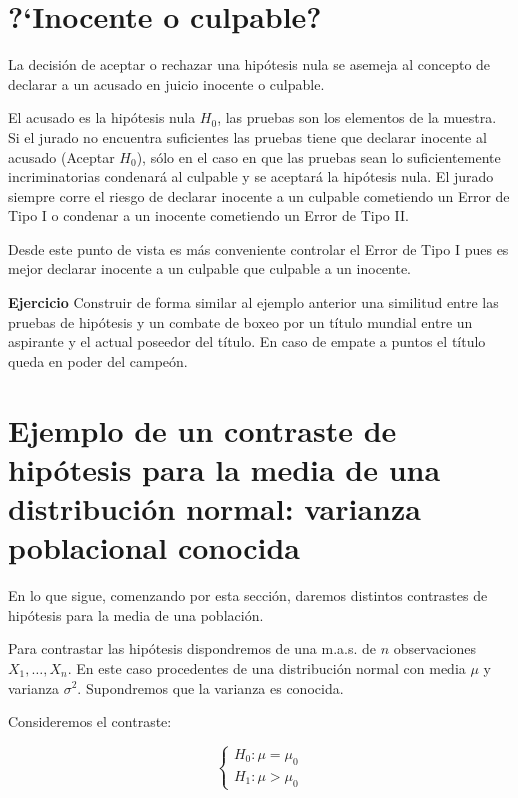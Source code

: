 \documentclass[12pt]{report}
\begin{document}
   \section{?`Inocente o culpable?}

   La decisión de aceptar o rechazar una hipótesis nula se asemeja
   al concepto de declarar a un acusado en juicio inocente o culpable.

   El acusado es la hipótesis nula $H_{0}$, las pruebas son los
   elementos de la muestra. Si el jurado no encuentra suficientes las
   pruebas tiene que declarar inocente al acusado (Aceptar $H_{0}$),
   sólo en el caso en que las pruebas sean lo suficientemente
   incriminatorias condenará al culpable y se aceptará la hipótesis
   nula. El jurado siempre corre el riesgo de declarar inocente a un
   culpable cometiendo un Error de Tipo I o
    condenar a un inocente cometiendo un Error de Tipo II.

   Desde este punto de vista es más conveniente controlar el Error de
   Tipo I pues es mejor declarar inocente a un culpable que culpable
   a un inocente.

   \textbf{Ejercicio}
   Construir de forma similar al ejemplo anterior una similitud entre
   las pruebas de hipótesis y un combate de boxeo por un título
   mundial entre un aspirante y el actual poseedor del título.
    En caso de empate a puntos  el título queda en
   poder del campeón.

    \section{Ejemplo de un  contraste de hipótesis para la media  de una
    distribución normal: varianza poblacional conocida}

    En lo que sigue, comenzando por esta sección, daremos distintos
    contrastes de hipótesis para la media de una población.

    Para contrastar las hipótesis dispondremos de una m.a.s. de $n$
    observaciones $X_{1},\ldots,X_{n}$. En este caso procedentes de
    una distribución normal con media $\mu$ y varianza $\sigma^2$.
    Supondremos que la varianza es conocida.


    Consideremos el contraste:

    $$\left\{\begin{array}{l}
H_{0}:\mu=\mu_{0}\\ H_{1}:\mu>\mu_{0}
\end{array}
    \right.$$
\end{document}
